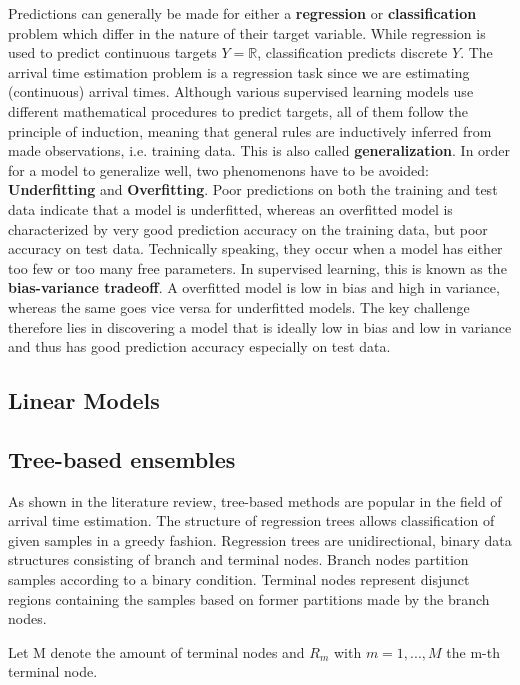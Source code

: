 Predictions can generally be made for either a \textbf{regression} or \textbf{classification} problem which differ in the nature of their target variable. While regression is used to predict continuous targets $ Y = \mathbb{R} $, classification predicts discrete $ Y $. The arrival time estimation problem is a regression task since we are estimating (continuous) arrival times.
Although various supervised learning models use different mathematical procedures to predict targets, all of them follow the principle of induction, meaning that general rules are inductively inferred from made observations, i.e. training data. This is also called \textbf{generalization}.  
In order for a model to generalize well, two phenomenons have to be avoided: \textbf{Underfitting} and \textbf{Overfitting}. Poor predictions on both the training and test data indicate that a model is underfitted, whereas an overfitted model is characterized by very good prediction accuracy on the training data, but poor accuracy on test data. Technically speaking, they occur when a model has either too few or too many free parameters. In supervised learning, this is known as the \textbf{bias-variance tradeoff}. A overfitted model is low in bias and high in variance, whereas the same goes vice versa for underfitted models. The key challenge therefore lies in discovering a model that is ideally low in bias and low in variance and thus has good prediction accuracy especially on test data.
 
\subsection{Linear Models}

\subsection{Tree-based ensembles}

As shown in the literature review, tree-based methods are popular in the field of arrival time estimation. 
The structure of regression trees allows classification of given samples in a greedy fashion. Regression trees are unidirectional, binary data structures consisting of branch and terminal nodes. Branch nodes partition samples according to a binary condition. Terminal nodes represent disjunct regions containing the samples based on former partitions made by the branch nodes.

Let M denote the amount of terminal nodes and $ R_m $ with $ m = 1, ..., M $ the m-th terminal node. 









